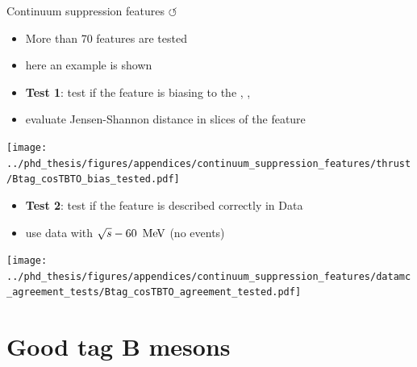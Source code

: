 \documentclass[xcolor=dvipsnames]{beamer}
\begin{document}
\begin{frame}{Continuum suppression features \hyperlink{frame:A}{$\circlearrowleft$}}

   \scriptsize\centering

   \begin{itemize}
      \item More than 70 features are tested
      \item[\ra] here an example is shown
   \end{itemize}

   \begin{itemize}
      \item \textbf{Test 1}: test if the feature is biasing to the \EB, \Estar, \Mbc  
      \item[\ra] evaluate Jensen-Shannon distance in slices of the feature
   \end{itemize}

   \texttt{[image: ../phd\_thesis/figures/appendices/continuum\_suppression\_features/thrust/Btag\_cosTBTO\_bias\_tested.pdf]}


   \begin{itemize}
      \item \textbf{Test 2}: test if the feature is described correctly in Data
      \item[\ra] use data with $\sqrt{s}-60~\mathrm{\,Me\kern -0.1em V}$ (no \FourS events)
   \end{itemize}



   \texttt{[image: ../phd\_thesis/figures/appendices/continuum\_suppression\_features/datamc\_agreement\_tests/Btag\_cosTBTO\_agreement\_tested.pdf]}

\end{frame}

\section{Good tag B mesons}
\end{document}
